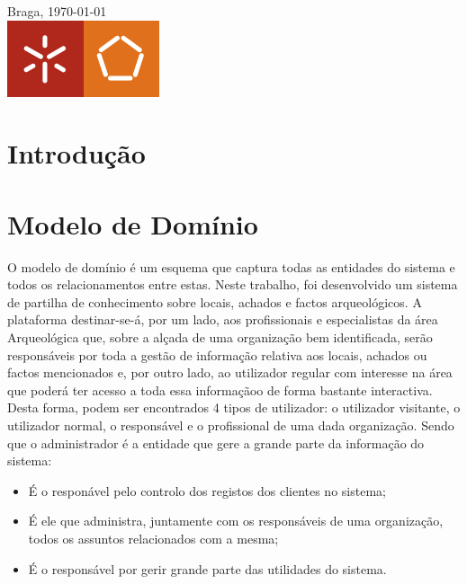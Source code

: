 ﻿\documentclass[12pt,a4paper]{article}
\begin{document}
\begin{titlepage}
Braga, {\large \today}\\[1cm] %


\includegraphics[scale=1]{escola_eng.png}\\[0cm] %
 

\vfill %

\end{titlepage}
\thispagestyle{empty}
\newpage

\tableofcontents
\newpage

\section{Introdução}


\newpage

\section{Modelo de Domínio}
O modelo de domínio é um esquema que captura todas as entidades do sistema e todos os relacionamentos entre estas. Neste trabalho, foi desenvolvido um sistema de partilha de conhecimento sobre locais, achados e factos arqueológicos. A plataforma destinar-se-á, por um lado, aos profissionais e especialistas da área Arqueológica que, sobre a alçada de uma organização bem identificada, serão responsáveis por toda a gestão de informação relativa aos locais, achados ou factos mencionados e, por outro lado, ao utilizador regular com interesse na área que poderá ter acesso a toda essa informaçãoo de forma bastante interactiva. Desta forma, podem ser encontrados 4 tipos de utilizador: o utilizador visitante, o utilizador normal, o responsável e o profissional de uma dada organização. Sendo que o administrador é a entidade que gere a grande parte da informação do sistema:\\
\begin{itemize}
\item É o responável pelo controlo dos registos dos clientes no sistema;
\item É ele que administra, juntamente com os responsáveis de uma organização, todos os assuntos relacionados com a mesma;
\item É o responsável por gerir grande parte das utilidades do sistema.
\end{itemize}
\end{document}
